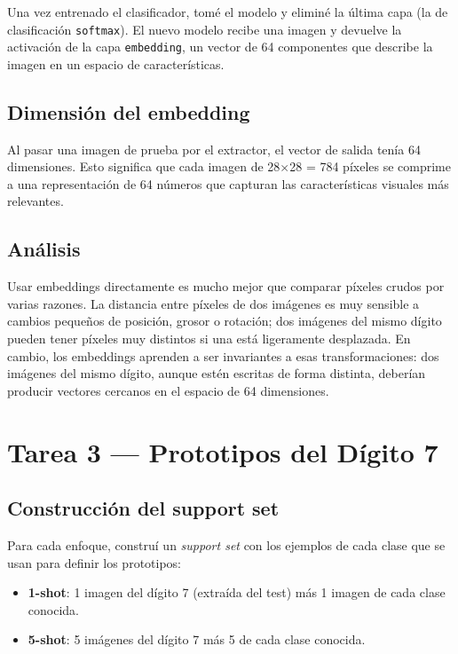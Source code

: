 \documentclass[../../__memoria.tex]{subfiles}
\begin{document}
Una vez entrenado el clasificador, tomé el modelo y eliminé la última capa (la de clasificación \texttt{softmax}). El nuevo modelo recibe una imagen y devuelve la activación de la capa \texttt{embedding}, un vector de 64 componentes que describe la imagen en un espacio de características.

\subsection{Dimensión del embedding}

Al pasar una imagen de prueba por el extractor, el vector de salida tenía 64 dimensiones. Esto significa que cada imagen de 28$\times$28 = 784 píxeles se comprime a una representación de 64 números que capturan las características visuales más relevantes.

\subsection{Análisis}

Usar embeddings directamente es mucho mejor que comparar píxeles crudos por varias razones. La distancia entre píxeles de dos imágenes es muy sensible a cambios pequeños de posición, grosor o rotación; dos imágenes del mismo dígito pueden tener píxeles muy distintos si una está ligeramente desplazada. En cambio, los embeddings aprenden a ser invariantes a esas transformaciones: dos imágenes del mismo dígito, aunque estén escritas de forma distinta, deberían producir vectores cercanos en el espacio de 64 dimensiones.

\section[Tarea 3: Prototipos]{Tarea 3 --- Prototipos del Dígito 7}

\subsection{Construcción del support set}

Para cada enfoque, construí un \textit{support set} con los ejemplos de cada clase que se usan para definir los prototipos:
\begin{itemize}
    \item \textbf{1-shot}: 1 imagen del dígito 7 (extraída del test) más 1 imagen de cada clase conocida.
    \item \textbf{5-shot}: 5 imágenes del dígito 7 más 5 de cada clase conocida.
\end{itemize}
\end{document}
